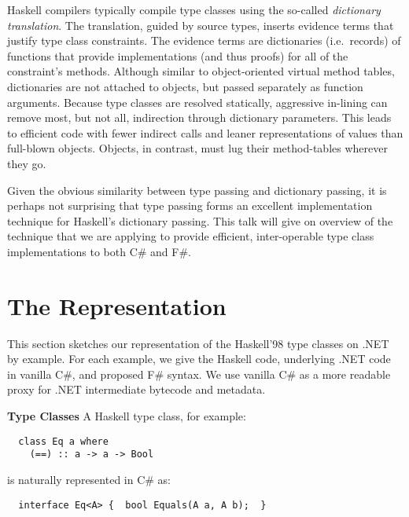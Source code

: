 \documentclass[9pt]{sig-alternate-05-2015}
\begin{document}
Haskell compilers typically compile type classes using the so-called
\emph{dictionary translation}.  The translation, guided by source
types, inserts evidence terms that justify type class constraints. The evidence terms are dictionaries (i.e.\ records) of functions that provide implementations (and thus proofs) for all of the constraint's methods. Although similar to
object-oriented virtual method tables, dictionaries are not attached to
objects, but passed separately as function arguments.  Because type
classes are resolved statically, aggressive in-lining can remove most,
but not all, indirection through dictionary parameters. This leads to
efficient code with fewer indirect calls and leaner representations of values than full-blown objects. Objects, in contrast, must lug their method-tables wherever they go.

Given the obvious similarity between type passing and dictionary
passing, it is perhaps not surprising that type passing forms an
excellent implementation technique for Haskell's dictionary passing. 
This talk will give on overview of the technique that we are applying to provide
efficient, inter-operable type class implementations to both C\# and F\#.


\section{The Representation}

This section sketches our representation of the Haskell'98 type classes on .NET by example.
For each example, we give the Haskell code, underlying .NET code in vanilla C\#, and proposed F\# syntax.
We use vanilla C\# as a more readable proxy for .NET intermediate bytecode and metadata.


{\bf Type Classes} A Haskell type class, for example:

{
\small
{}
\begin{lstlisting}
  class Eq a where 
    (==) :: a -> a -> Bool
\end{lstlisting}}
\noindent is naturally represented in C\# as:
\begin{lstlisting}
  interface Eq<A> {  bool Equals(A a, A b);  }
\end{lstlisting}
\end{document}
